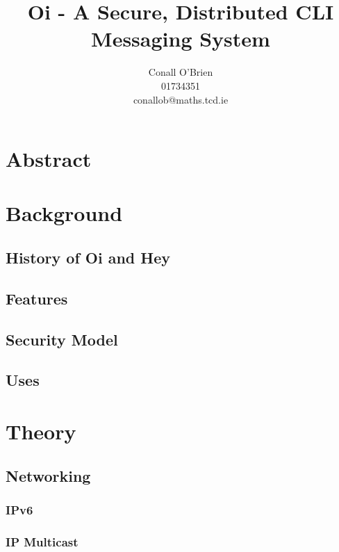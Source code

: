 \documentclass[a4paper,12pt]{article}
\begin{document}
\title{Oi - A Secure, Distributed CLI Messaging System}

\author{Conall O'Brien \\ 01734351 \\ conallob@maths.tcd.ie}

\maketitle


\section*{Abstract}


\tableofcontents


\section{Background}


\subsection{History of Oi and Hey} 

\subsection{Features}

\subsection{Security Model}

\subsection{Uses}


\section{Theory}


\subsection{Networking}

\subsubsection{IPv6}

\subsubsection{IP Multicast}
\end{document}
